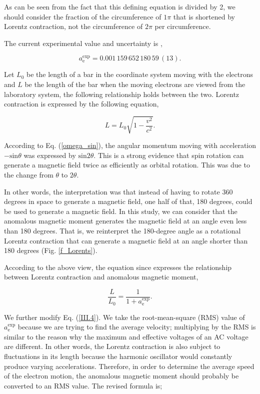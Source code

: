 \documentclass[10.5pt]{article}
\numberwithin{equation}{section}
\begin{document}
As can be seen from the fact that this defining equation is divided by 2, we should consider the fraction of the circumference of $1\pi$ that is shortened by Lorentz contraction, not the circumference of $2\pi$ per circumference.


The current experimental value and uncertainty is \cite{Fan},

    \begin{equation}
          {\displaystyle a^{\text{exp}}_{\text{e}}=0.001\,159\,652\,180\,59\,(13)} .
          \label{}
    \end{equation}


Let $L_0$ be the length of a bar in the coordinate system moving with the electrons and $L$ be the length of the bar when the moving electrons are viewed from the laboratory system, the following relationship holds between the two. Lorentz contraction is expressed by the following equation,


    \begin{equation}
        L = L_0 \sqrt{1 - \frac{v^2}{c^2}} .
    \end{equation}


According to Eq. (\ref{omega_sin}), the angular momentum moving with acceleration $\mathrm{-sin}\theta$ was expressed by $\mathrm{sin}2\theta$. This is a strong evidence that spin rotation can generate a magnetic field twice as efficiently as orbital rotation. This was due to the change from $\theta$ to $2\theta$.

In other words, the interpretation was that instead of having to rotate 360 degrees in space to generate a magnetic field, one half of that, 180 degrees, could be used to generate a magnetic field. In this study, we can consider that the anomalous magnetic moment generates the magnetic field at an angle even less than 180 degrees. That is, we reinterpret the 180-degree angle as a rotational Lorentz contraction that can generate a magnetic field at an angle shorter than 180 degrees (Fig. \ref{f_Lorents}).

According to the above view, the equation since expresses the relationship between Lorentz contraction and anomalous magnetic moment,

    \begin{equation}
        \frac{L}{L_0} = \frac{1}{1 + a^{\text{exp}}_{\text{e}}} .
        \label{III.4}
    \end{equation}


We further modify Eq. (\ref{III.4}). We take the root-mean-square (RMS) value of $a^{\text{exp}}_{\text{e}}$ because we are trying to find the average velocity; multiplying by the RMS is similar to the reason why the maximum and effective voltages of an AC voltage are different. In other words, the Lorentz contraction is also subject to fluctuations in its length because the harmonic oscillator would constantly produce varying accelerations. Therefore, in order to determine the average speed of the electron motion, the anomalous magnetic moment should probably be converted to an RMS value. The revised formula is;
\end{document}
